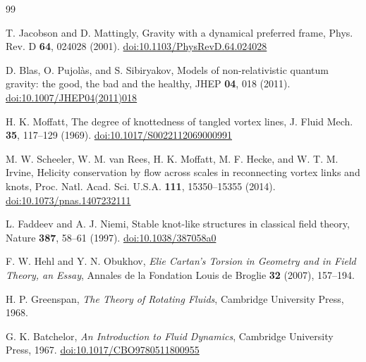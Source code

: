 \documentclass[11pt]{article}
\begin{document}
    
    \begin{thebibliography}{99}\setlength{\itemsep}{1pt}

        T. Jacobson and D. Mattingly,
        \newblock Gravity with a dynamical preferred frame,
        \newblock Phys. Rev. D \textbf{64}, 024028 (2001).
        \newblock \href{https://doi.org/10.1103/PhysRevD.64.024028}{doi:10.1103/PhysRevD.64.024028}

        D. Blas, O. Pujol{\`a}s, and S. Sibiryakov,
        \newblock Models of non-relativistic quantum gravity: the good, the bad and the healthy,
        \newblock JHEP \textbf{04}, 018 (2011).
        \newblock \href{https://doi.org/10.1007/JHEP04(2011)018}{doi:10.1007/JHEP04(2011)018}

        H. K. Moffatt,
        \newblock The degree of knottedness of tangled vortex lines,
        \newblock J. Fluid Mech. \textbf{35}, 117--129 (1969).
        \newblock \href{https://doi.org/10.1017/S0022112069000991}{doi:10.1017/S0022112069000991}

        M. W. Scheeler, W. M. van Rees, H. K. Moffatt, M. F. Hecke, and W. T. M. Irvine,
        \newblock Helicity conservation by flow across scales in reconnecting vortex links and knots,
        \newblock Proc. Natl. Acad. Sci. U.S.A. \textbf{111}, 15350--15355 (2014).
        \newblock \href{https://doi.org/10.1073/pnas.1407232111}{doi:10.1073/pnas.1407232111}

        L. Faddeev and A. J. Niemi,
        \newblock Stable knot-like structures in classical field theory,
        \newblock Nature \textbf{387}, 58--61 (1997).
        \newblock \href{https://doi.org/10.1038/387058a0}{doi:10.1038/387058a0}

        F. W. Hehl and Y. N. Obukhov,
        \textit{Elie Cartan's Torsion in Geometry and in Field Theory, an Essay},
        Annales de la Fondation Louis de Broglie \textbf{32} (2007), 157--194.

        H. P. Greenspan,
        \textit{The Theory of Rotating Fluids},
        Cambridge University Press, 1968.

        G. K. Batchelor,
        \textit{An Introduction to Fluid Dynamics},
        Cambridge University Press, 1967.
        \href{https://doi.org/10.1017/CBO9780511800955}{doi:10.1017/CBO9780511800955}
        

\end{thebibliography}
\end{document}

